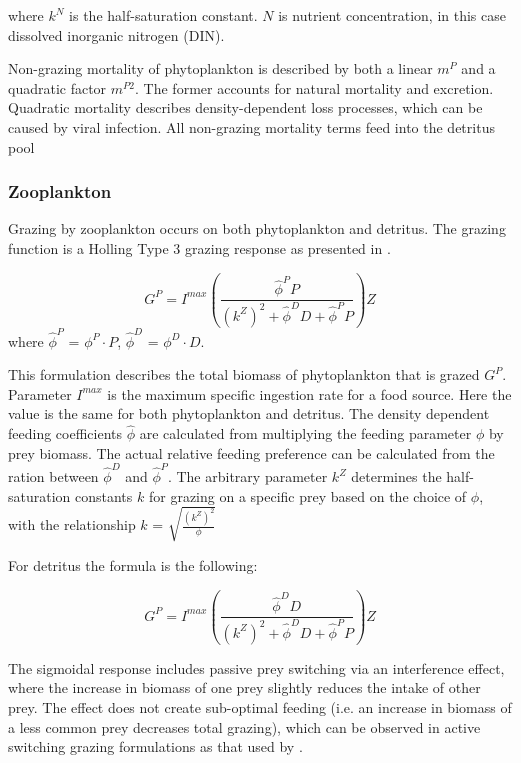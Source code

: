 \documentclass[template.tex]{subfiles}
\begin{document}
where $k^N$ is the half-saturation constant. $N$ is nutrient concentration, in this case dissolved inorganic nitrogen (DIN).

Non-grazing mortality of phytoplankton is described by both a linear $m^P$ and a quadratic factor $m^{P2}$. The former accounts for natural mortality and excretion. Quadratic mortality describes density-dependent loss processes, which can be caused by viral infection. All non-grazing mortality terms feed into the detritus pool

\subsubsection{Zooplankton}
Grazing by zooplankton occurs on both phytoplankton and detritus. The grazing function is a Holling Type 3 grazing response as presented in \citet{Anderson2015c}.

\begin{equation}
    G^P = I^{max} \left( \frac{ \hat{\phi}^P P}{(k^Z)^2 + \hat{\phi}^D D +\hat{\phi}^P P}  \right) Z
\end{equation}
where $\hat{\phi}^P$ = $\phi^P \cdot P$, $\hat{\phi}^D$ = $\phi^D \cdot D$.

This formulation describes the total biomass of phytoplankton that is grazed $G^P$. Parameter $I^{max}$ is the maximum specific ingestion rate for a food source. Here the value is the same for both phytoplankton and detritus. The density dependent feeding coefficients $\hat{\phi}$ are calculated from multiplying the feeding parameter $\phi$ by prey biomass. The actual relative feeding preference can be calculated from the ration between $\hat{\phi}^D$ and $\hat{\phi}^P$. The arbitrary parameter $k^Z$ determines the half-saturation constants $k$ for grazing on a specific prey based on the choice of $\phi$, with the relationship $k$ = $\sqrt{\frac{(k^Z)^2 }{ \phi}}$

For detritus the formula is the following:

\begin{equation}
    G^P = I^{max} \left( \frac{ \hat{\phi}^D D}{(k^Z)^2 + \hat{\phi}^D D +\hat{\phi}^P P}  \right) Z
\end{equation}

The sigmoidal response includes passive prey switching via an interference effect, where the increase in biomass of one prey slightly reduces the intake of other prey. The effect does not create sub-optimal feeding (i.e. an increase in biomass of a less common prey decreases total grazing), which can be observed in active switching grazing formulations as that used by \citet{Fasham1990a}.
\end{document}
